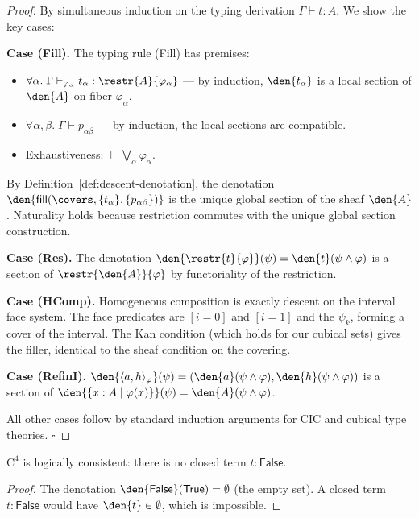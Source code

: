 \begin{proof}
By simultaneous induction on the typing derivation
\(\Gamma \vdash t : A\).  We show the key cases:

\medskip\noindent
\textbf{Case (Fill).}
The typing rule (Fill) has premises:
\begin{itemize}
\item \(\forall \alpha.\; \Gamma \vdash_{\varphi_\alpha} t_\alpha :
  \restr{A}{\varphi_\alpha}\) --- by induction, \(\den{t_\alpha}\)
  is a local section of \(\den{A}\) on fiber \(\varphi_\alpha\).
\item \(\forall \alpha, \beta.\; \Gamma \vdash p_{\alpha\beta}\) ---
  by induction, the local sections are compatible.
\item Exhaustiveness: \(\vdash \bigvee_\alpha \varphi_\alpha\).
\end{itemize}
By Definition~\ref{def:descent-denotation}, the denotation
\(\den{\mathsf{fill}(\covers, \{t_\alpha\}, \{p_{\alpha\beta}\})}\)
is the unique global section of the sheaf \(\den{A}\).
Naturality holds because restriction commutes with the unique
global section construction.

\medskip\noindent
\textbf{Case (Res).}
The denotation
\(\den{\restr{t}{\varphi}}(\psi) = \den{t}(\psi \wedge \varphi)\)
is a section of \(\restr{\den{A}}{\varphi}\) by functoriality of
the restriction.

\medskip\noindent
\textbf{Case (HComp).}
Homogeneous composition is exactly descent on the interval face system.
The face predicates are \([i = 0]\) and \([i = 1]\) and the \(\psi_k\),
forming a cover of the interval.  The Kan condition (which holds
for our cubical sets) gives the filler, identical to the sheaf condition
on the covering.

\medskip\noindent
\textbf{Case (RefinI).}
\(\den{\langle a, h \rangle_\varphi}(\psi) =
(\den{a}(\psi \wedge \varphi), \den{h}(\psi \wedge \varphi))\)
is a section of \(\den{\{x : A \mid \varphi(x)\}}(\psi)
= \den{A}(\psi \wedge \varphi)\).

All other cases follow by standard induction arguments for CIC
and cubical type theories.  \hfill\(\square\)
\end{proof}

\begin{corollary}
\(\mathrm{C}^4\) is logically consistent: there is no closed term
\(t : \mathsf{False}\).
\end{corollary}

\begin{proof}
The denotation \(\den{\mathsf{False}}(\mathsf{True}) = \emptyset\)
(the empty set).  A closed term \(t : \mathsf{False}\) would have
\(\den{t} \in \emptyset\), which is impossible.
\end{proof}


